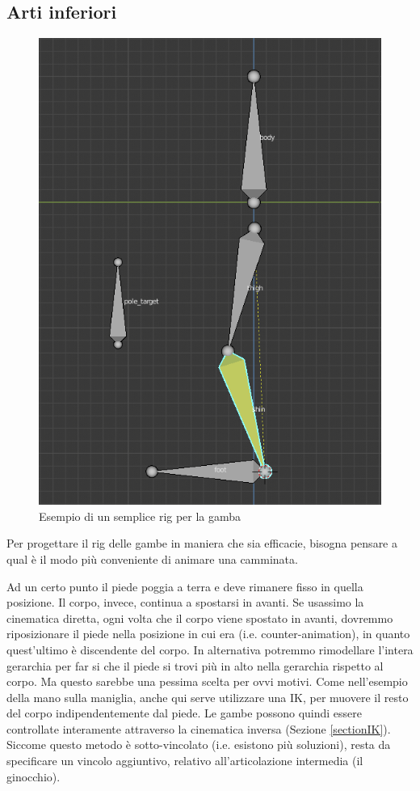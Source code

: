 \subsection{Arti inferiori}

\begin{figure}
\centering
\includegraphics[width=.8\textwidth]{Figures/leg}
\decoRule
\caption[Rig gamba]{Esempio di un semplice rig per la gamba}
\label{fig:leg}
\end{figure}

Per progettare il rig delle gambe in maniera che sia efficacie, bisogna pensare a qual è il modo più conveniente di animare una camminata.

Ad un certo punto il piede poggia a terra e deve rimanere fisso in quella posizione. Il corpo, invece, continua a spostarsi in avanti.
Se usassimo la cinematica diretta, ogni volta che il corpo viene spostato in avanti, dovremmo riposizionare il piede nella posizione in cui era (i.e. counter-animation), in quanto quest'ultimo è discendente del corpo.
In alternativa potremmo rimodellare l'intera gerarchia per far si che il piede si trovi più in alto nella gerarchia rispetto al corpo. Ma questo sarebbe una pessima scelta per ovvi motivi.
Come nell'esempio della mano sulla maniglia, anche qui serve utilizzare una IK, per muovere il resto del corpo indipendentemente dal piede.
Le gambe possono quindi essere controllate interamente attraverso la cinematica inversa (Sezione \ref{sectionIK}).
Siccome questo metodo è sotto-vincolato (i.e. esistono più soluzioni), resta da specificare un vincolo aggiuntivo, relativo all'articolazione intermedia (il ginocchio).

